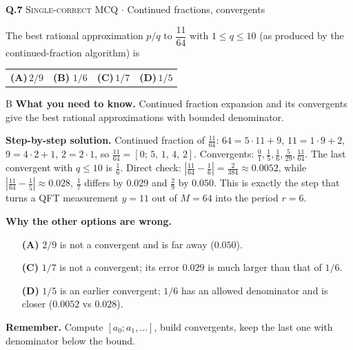 \documentclass[11pt,a4paper]{article}
\newcommand{\optlabel}[1]{\textbf{(#1)}}
\newcommand{\correctlabel}[1]{\textcolor{okgreen}{\textbf{(#1)}\,\ding{51}}}
\newenvironment{qitem}[1]{\begin{list}{}{\setlength{\leftmargin}{3.3em}\setlength{\labelwidth}{3.1em}%
  \setlength{\labelsep}{0.2em}\setlength{\topsep}{3pt}\setlength{\parsep}{3pt}}\item[\textbf{Q.#1}\hfill]}{\end{list}}
\newcommand{\qsep}{\par\vspace{2pt}{\color{black!15}\hrule}\vspace{4pt}}
\newcommand{\qmeta}[2]{{\footnotesize\color{black!60}\textsc{#1} \;$\cdot$\; #2}\par}
\begin{document}
\begin{qitem}{7}
\qmeta{Single-correct MCQ}{Continued fractions, convergents}
The best rational approximation $p/q$ to $\dfrac{11}{64}$ with $1 \le q \le 10$ (as produced by the continued-fraction
algorithm) is
\par\smallskip\noindent\begin{tabularx}{\linewidth}{@{}*{4}{L}@{}}
\optlabel{A}\,$2/9$ & \correctlabel{B}\,$1/6$ & \optlabel{C}\,$1/7$ & \optlabel{D}\,$1/5$
\end{tabularx}
\end{qitem}
\begin{solbox}{B}
\textbf{\color{brand}What you need to know.} Continued fraction expansion and its convergents give the best rational approximations with bounded denominator.

\textbf{\color{brand}Step-by-step solution.} Continued fraction of $\frac{11}{64}$: $64 = 5\cdot 11 + 9$, $11 = 1\cdot 9 + 2$, $9 = 4\cdot 2 + 1$, $2 = 2\cdot 1$, so
$\frac{11}{64} = [0;\,5,\,1,\,4,\,2]$. Convergents: $\frac{0}{1}, \frac15, \frac16, \frac{5}{29}, \frac{11}{64}$.
The last convergent with $q \le 10$ is $\frac16$. Direct check: $\left|\frac{11}{64} - \frac16\right| = \frac{2}{384} \approx 0.0052$,
while $\left|\frac{11}{64} - \frac15\right| \approx 0.028$, $\frac17$ differs by $0.029$ and $\frac29$ by $0.050$.
This is exactly the step that turns a QFT measurement $y = 11$ out of $M = 64$ into the period $r = 6$.

\textbf{\color{brand}Why the other options are wrong.}
\begin{itemize}[leftmargin=2.4em, itemsep=1pt, topsep=2pt]
\item[\textbf{(A)}] $2/9$ is not a convergent and is far away ($0.050$).
\item[\textbf{(C)}] $1/7$ is not a convergent; its error $0.029$ is much larger than that of $1/6$.
\item[\textbf{(D)}] $1/5$ is an earlier convergent; $1/6$ has an allowed denominator and is closer ($0.0052$ vs $0.028$).
\end{itemize}
\textbf{\color{brand}Remember.} Compute $[a_0; a_1, \dots]$, build convergents, keep the last one with denominator below the bound.
\end{solbox}
\qsep
\end{document}
